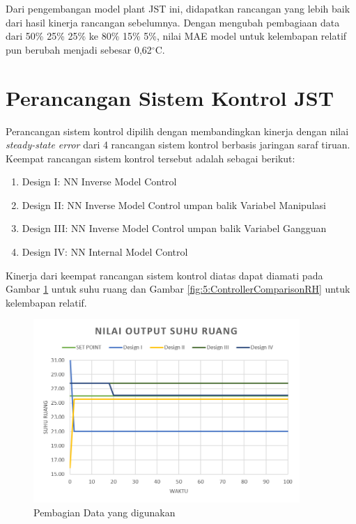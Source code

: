 Dari pengembangan model plant JST ini, didapatkan rancangan yang lebih baik dari hasil kinerja rancangan sebelumnya. Dengan mengubah pembagiaan data dari 50\% 25\% 25\% ke 80\% 15\% 5\%, nilai MAE model untuk kelembapan relatif pun berubah menjadi sebesar 0,62$^\circ$C.

\section{Perancangan Sistem Kontrol JST}

Perancangan sistem kontrol dipilih dengan membandingkan kinerja dengan nilai \textit{steady-state error} dari 4 rancangan sistem kontrol berbasis jaringan saraf tiruan. Keempat rancangan sistem kontrol tersebut adalah sebagai berikut:
\begin{enumerate}
	\item Design I: NN Inverse Model Control
	\item Design II: NN Inverse Model Control umpan balik Variabel Manipulasi
	\item Design III: NN Inverse Model Control umpan balik Variabel Gangguan
	\item Design IV: NN Internal Model Control
\end{enumerate}

Kinerja dari keempat rancangan sistem kontrol diatas dapat diamati pada Gambar \ref{fig:5:ControllerComparisonTd} untuk suhu ruang dan Gambar \ref{fig:5:ControllerComparisonRH} untuk kelembapan relatif.

\begin{figure}[!h]
	\centering
	\includegraphics[width=0.9\textwidth]{figures/ControlSystemComparisonTd}
	\caption{Pembagian Data yang digunakan}
	\label{fig:5:ControllerComparisonTd}
\end{figure}

